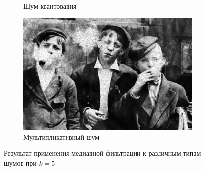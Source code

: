 \begin{figure}[ht]
\begin{subfigure}[b]{0.5\linewidth}
      \caption{Шум квантования} 
      \label{median_5:e}
    \end{subfigure}%
    \begin{subfigure}[b]{0.5\linewidth}
        \centering
        \includegraphics[width=0.95\linewidth]{../Median_FIlter/Median_Speckle_noise_(k=5).jpg} 
        \caption{Мультипликативный шум} 
        \label{median_5:f} 
    \end{subfigure} 
    \caption{Результат применения медианной фильтрации к различным типам шумов при $k = 5$}
    \label{img:median_5} 
\end{figure}

